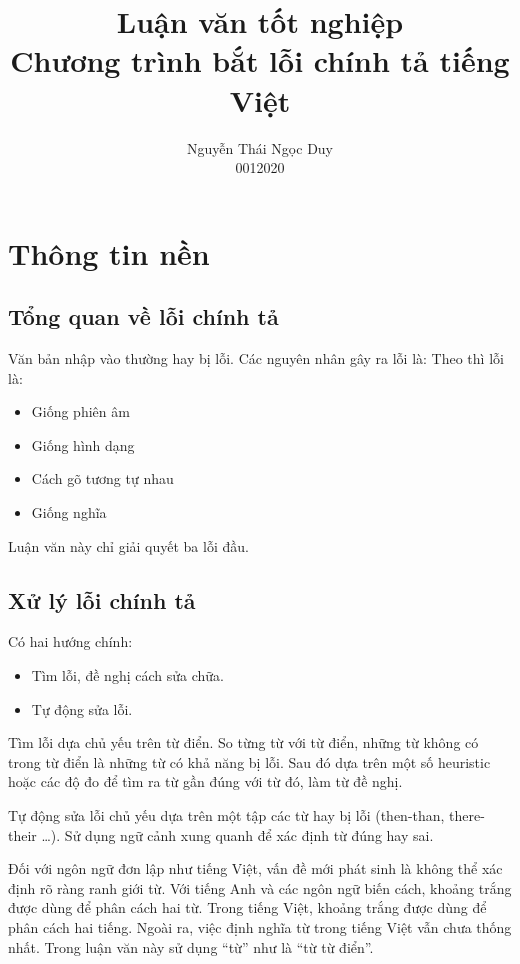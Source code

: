 \documentclass[a4paper,oneside]{book} %
\title{Luận văn tốt nghiệp\\Chương trình bắt lỗi chính tả tiếng Việt}
\author{Nguyễn Thái Ngọc Duy\\0012020}
\begin{document}
\tableofcontents{}

\chapter{Thông tin nền}
\label{cha:background}

\section{Tổng quan về lỗi chính tả}

Văn bản nhập vào thường hay bị lỗi. Các nguyên nhân gây ra lỗi là:
Theo \cite{Chang} thì lỗi là:
\begin{itemize}
\item Giống phiên âm
\item Giống hình dạng
\item Cách gõ tương tự nhau
\item Giống nghĩa
\end{itemize}

Luận văn này chỉ giải quyết ba lỗi đầu.

\section{Xử lý lỗi chính tả}

Có hai hướng chính:
\begin{itemize}
\item Tìm lỗi, đề nghị cách sửa chữa.
\item Tự động sửa lỗi.
\end{itemize}

Tìm lỗi dựa chủ yếu trên từ điển. So từng từ với từ điển, những từ
không có trong từ điển là những từ có khả năng bị lỗi. Sau đó dựa trên
một số heuristic hoặc các độ đo để tìm ra từ gần đúng với từ đó, làm
từ đề nghị.

Tự động sửa lỗi chủ yếu dựa trên một tập các từ hay bị lỗi (then-than,
there-their \ldots). Sử dụng ngữ cảnh xung quanh để xác định từ đúng
hay sai.

Đối với ngôn ngữ đơn lập như tiếng Việt, vấn đề mới phát sinh là không
thể xác định rõ ràng ranh giới từ. Với tiếng Anh và các ngôn ngữ biến
cách, khoảng trắng được dùng để phân cách hai từ. Trong tiếng Việt,
khoảng trắng được dùng để phân cách hai tiếng. Ngoài ra, việc định
nghĩa từ trong tiếng Việt vẫn chưa thống nhất. Trong luận văn này sử
dụng ``từ'' như là ``từ từ điển''.
\end{document}
